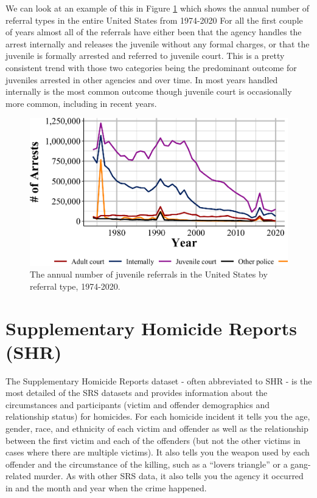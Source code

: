 \documentclass[
  12pt,
  openany]{book}
\begin{document}
We can look at an example of this in Figure \ref{fig:phillyJuvenileReferrals} which shows the annual number of referral types in the entire United States from 1974-2020 For all the first couple of years almost all of the referrals have either been that the agency handles the arrest internally and releases the juvenile without any formal charges, or that the juvenile is formally arrested and referred to juvenile court. This is a pretty consistent trend with those two categories being the predominant outcome for juveniles arrested in other agencies and over time. In most years handled internally is the most common outcome though juvenile court is occasionally more common, including in recent years.

\begin{figure}

{\centering \includegraphics[width=0.9\linewidth]{05_arrests_files/figure-latex/phillyJuvenileReferrals-1} 

}

\caption{The annual number of juvenile referrals in the United States by referral type, 1974-2020.}\label{fig:phillyJuvenileReferrals}
\end{figure}

\chapter{Supplementary Homicide Reports (SHR)}\label{shr}

The Supplementary Homicide Reports dataset - often abbreviated to SHR - is the most detailed of the SRS datasets and provides information about the circumstances and participants (victim and offender demographics and relationship status) for homicides. For each homicide incident it tells you the age, gender, race, and ethnicity of each victim and offender as well as the relationship between the first victim and each of the offenders (but not the other victims in cases where there are multiple victims). It also tells you the weapon used by each offender and the circumstance of the killing, such as a ``lovers triangle'' or a gang-related murder. As with other SRS data, it also tells you the agency it occurred in and the month and year when the crime happened.
\end{document}

